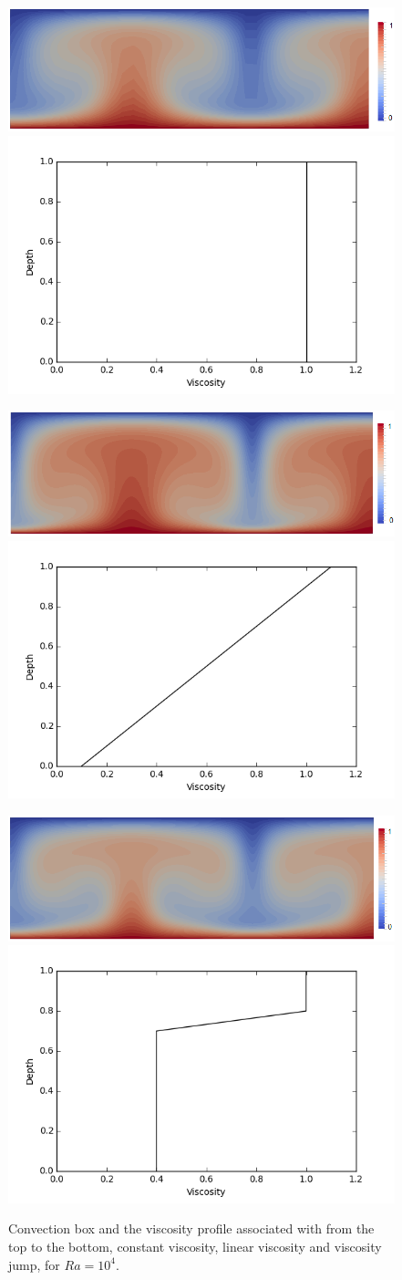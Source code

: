 \documentclass{article}
\begin{document}
\begin{figure}
    \begin{center}
    \includegraphics[width=0.55\linewidth]{cookbooks/convection-box/convectionboxratio3modif.png}
    \includegraphics[width=0.2\linewidth]{cookbooks/convection-box/constantviscosityprofile.png}
    
    \includegraphics[width=0.55\linewidth]{cookbooks/convection-box/linearviscosityratio3modif.png}
    \includegraphics[width=0.2\linewidth]{cookbooks/convection-box/linearviscosityprofile.png}

    \includegraphics[width=0.55\linewidth]{cookbooks/convection-box/viscosityjumpratio3modif.png}
    \includegraphics[width=0.2\linewidth]{cookbooks/convection-box/viscosityjumpprofile.png}
    \caption{Convection box and the viscosity profile associated with from the top to the bottom, constant viscosity, linear viscosity and viscosity jump, for $Ra=10^4$.}
    \label{convectionbox}
       \end{center}
\end{figure}
\end{document}

